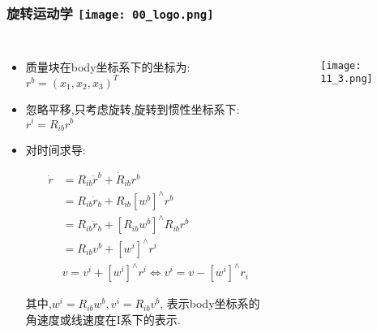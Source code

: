   \begin{frame}
    \frametitle{旋转运动学 \hfill \texttt{[image: 00\_logo.png]}}
    \begin{columns}
      
      \begin{itemize}
        \item 质量块在body坐标系下的坐标为: $r^b = (x_1, x_2, x_3)^T$
        \item 忽略平移,只考虑旋转,旋转到惯性坐标系下:$r^i = R_{ib} r^b$
        \item 对时间求导:
    
        \begin{equation}
          \begin{split}
            \dot{r} &= R_{ib} \dot{r}^b + \dot{R}_{ib} r^b \\
            &= R_{ib} \dot{r}_b + R_{ib}[w^b]^\land r^b \\
            &= R_{ib} \dot{r}_b + [R_{ib}w^b]^\land R_{ib}r^b \\
            &= R_{ib} v^b + [w^i]^\land r^i \\
            &v = v^i + [w^i]^\land r^i  \Leftrightarrow
            v^i = v - [w^i]^\land r_i
          \end{split}
        \end{equation}
    
        其中,$w^i = R_{ib} w^b, v^i = R_{ib}v^b$, 表示body坐标系的角速度或线速度在I系下的表示.
    
    
      \end{itemize}
      
      \begin{figure}[h]
        \texttt{[image: 11\_3.png]}
      \end{figure}
      
    
    \end{columns}
    \end{frame}  
  

   



